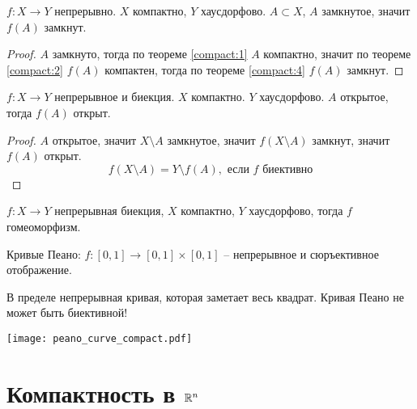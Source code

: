 \documentclass[main]{subfiles}
\begin{document}
\begin{theorem}\label{compact:5}
    $f: X \to Y$ непрерывно. $X$ компактно, $Y$ хаусдорфово. $A \subset X$, $A$ замкнутое, значит $f(A)$ замкнут.
\end{theorem}
\begin{proof}
    $A$  замкнуто, тогда по теореме \ref{compact:1}  $A$ компактно, значит по теореме \ref{compact:2}
    $f(A)$ компактен, тогда по теореме \ref{compact:4} $f(A)$ замкнут.
\end{proof}
\begin{corollary}
    $f: X \to Y$ непрерывное и биекция. $X$ компактно. $Y$ хаусдорфово.  $A$ открытое, тогда $f(A)$ открыт.
\end{corollary}
\begin{proof}
    $A$ открытое, значит $X \setminus A$ замкнутое, значит $f(X \setminus A)$ замкнут, значит $f(A)$ открыт.
    \[f(X \setminus A) = Y \setminus f(A),\text{ если $f$ биективно}\]
\end{proof}
\begin{corollary}
    $f: X \to Y$ непрерывная биекция, $X$ компактно, $Y$ хаусдорфово, тогда $f$ гомеоморфизм.
\end{corollary}

\begin{minipage}{0.45\textwidth}
    Кривые Пеано: $f: [0,1] \to [0,1] \times [0,1]$ -- непрерывное и сюръективное отображение.

    В пределе непрерывная кривая, которая заметает весь квадрат.
    Кривая Пеано не может быть биективной!
\end{minipage}
\begin{minipage}{0.45\textwidth}
    \texttt{[image: peano\_curve\_compact.pdf]}
\end{minipage}

\section{Компактность в \texorpdfstring{$\mathbb{R}^n$}{R\textasciicircum n}}
\end{document}
